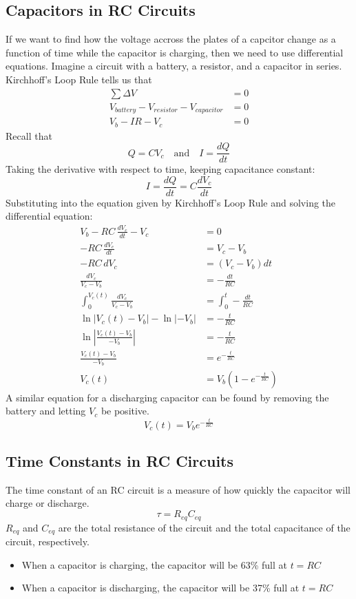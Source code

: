 \documentclass[12pt, titlepage]{article}
\begin{document}
\subsection*{Capacitors in RC Circuits}
If we want to find how the voltage accross the plates of a capcitor change as a function of time while the capacitor is charging, then we need to use differential equations. Imagine a circuit with a battery, a resistor, and a capacitor in series. Kirchhoff's Loop Rule tells us that
\begin{align*}
    \sum \Delta V &= 0 \\
    V_{battery} -V_{resistor} - V_{capacitor} &= 0 \\ 
    V_b-IR- V_c &= 0
\end{align*}
Recall that
\begin{equation*}
    Q=CV_c \quad \textrm{and} \quad
    I = \frac{dQ}{dt}
\end{equation*}
Taking the derivative with respect to time, keeping capacitance constant:
\begin{equation*}
    I= \frac{dQ}{dt} = C\frac{dV_c}{dt}
\end{equation*}
Substituting into the equation given by Kirchhoff's Loop Rule and solving the differential equation:
\begin{align*}
    V_b-RC \, \frac{dV_c}{dt}-V_c &= 0\\
    -RC \, \frac{dV_c}{dt}&=V_c-V_b \\
    -RC \, dV_c &= (V_c-V_b)dt \\
    \frac{dV_c}{V_c-V_b} &= -\frac{dt}{RC} \\
    \int_{0}^{V_c(t)}\frac{dV_c}{V_c-V_b} &= \int_{0}^{t}-\frac{dt}{RC} \\
    \ln |V_c(t)-V_b|-\ln |-V_b| &= -\frac{t}{RC} \\
    \ln |\frac{V_c(t)-V_b}{-V_b}| &= -\frac{t}{RC} \\
    \frac{V_c(t)-V_b}{-V_b} &= e^{-\frac{t}{RC}} \\
    V_c(t)&=\boxed{V_b(1-e^{-\frac{t}{RC}})}
\end{align*}
A similar equation for a discharging capacitor can be found by removing the battery and letting $V_c$ be positive.
\begin{equation*}
    V_c(t)=\boxed{V_be^{-\frac{t}{RC}}}
\end{equation*}
\subsection*{Time Constants in RC Circuits}
The time constant of an RC circuit is a measure of how quickly the capacitor will charge or discharge.
\begin{equation*}
    \tau = R_{eq}C_{eq}
\end{equation*}
$R_{eq}$ and $C_{eq}$ are the total resistance of the circuit and the total capacitance of the circuit, respectively.
\begin{itemize}
    \item When a capacitor is charging, the capacitor will be 63\% full at $t=RC$
    \item When a capacitor is discharging, the capacitor will be 37\% full at $t=RC$
\end{itemize}
\end{document}
